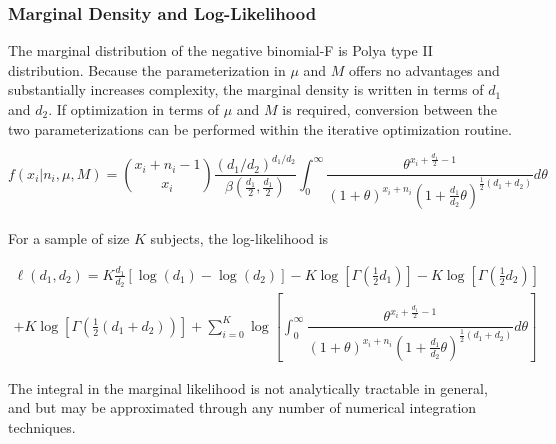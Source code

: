 \documentclass[12pt,epsfig]{article}
\begin{document}
\subsubsection{Marginal Density and Log-Likelihood}

The marginal distribution of the negative binomial-F is Polya type II distribution. Because the parameterization in $\mu$ and $M$ offers no advantages and substantially increases complexity, the marginal density is written in terms of $d_1$ and $d_2$. If optimization in terms of $\mu$ and $M$ is required, conversion between the two parameterizations can be performed within the iterative optimization routine.



\begin{equation*}
    f(x_i | n_i, \mu, M) = {x_i + n_i - 1 \choose x_i} \dfrac{(d_1/d_2)^{d_1/d_2}}{\beta(\frac{d_1}{2}, \frac{d_1}{2})} \displaystyle \int_{0}^\infty \dfrac{\theta^{x_i + \frac{d_1}{2} - 1}}{(1 + \theta)^{x_i + n_i}(1 + \frac{d_1}{d_2}\theta)^{\frac12(d_1 + d_2)}} d\theta
\end{equation*}\\


For a sample of size $K$ subjects, the log-likelihood is

\begin{multline*}
    \ell(d_1, d_2) = K \frac{d_1}{d_2} \left[\log(d_1) - \log(d_2)\right] - K \log\left[\Gamma\left(\frac12 d_1\right)\right] - K \log\left[\Gamma\left(\frac12 d_2\right)\right]\\ + K \log\left[\Gamma\left(\frac12(d_1 + d_2)\right)\right] 
     + \displaystyle \sum_{i = 0}^K \log \left[ \displaystyle \int_0^\infty \dfrac{\theta^{x_i + \frac{d_1}{2} - 1}}{(1 + \theta)^{x_i + n_i}(1 + \frac{d_1}{d_2}\theta)^{\frac12(d_1 + d_2)}} d\theta \right] 
\end{multline*}

The integral in the marginal likelihood is not analytically tractable in general, and but may be approximated through any number of numerical integration techniques.
\end{document}
